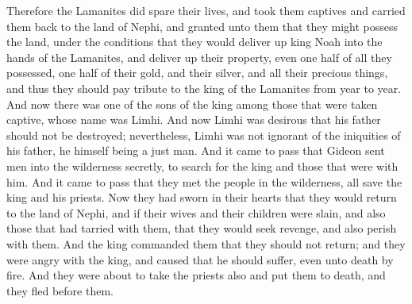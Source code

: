 Therefore the Lamanites did spare their lives, and took them captives and carried them back to the land of Nephi, and granted unto them that they might possess the land, under the conditions that they would deliver up king Noah into the hands of the Lamanites, and deliver up their property, even one half of all they possessed, one half of their gold, and their silver, and all their precious things, and thus they should pay tribute to the king of the Lamanites from year to year.
\bverse \iffalse And now there was one of the sons of the king among those that were taken captive, whose name was Limhi. \fi
And now there was one of the sons of the king among those that were taken captive, whose name was Limhi.
\bverse \iffalse And now Limhi was desirous that his father should not be destroyed; nevertheless, Limhi was not ignorant of the iniquities of his father, he himself being a just man. \fi
And now Limhi was desirous that his father should not be destroyed; nevertheless, Limhi was not ignorant of the iniquities of his father, he himself being a just man.
\bverse \iffalse And it came to pass that Gideon sent men into the wilderness secretly, to search for the king and those that were with him.  And it came to pass that they met the people in the wilderness, all save the king and his priests. \fi
And it came to pass that Gideon sent men into the wilderness secretly, to search for the king and those that were with him.  And it came to pass that they met the people in the wilderness, all save the king and his priests.
\bverse \iffalse Now they had sworn in their hearts that they would return to the land of Nephi, and if their wives and their children were slain, and also those that had tarried with them, that they would seek revenge, and also perish with them. \fi
Now they had sworn in their hearts that they would return to the land of Nephi, and if their wives and their children were slain, and also those that had tarried with them, that they would seek revenge, and also perish with them.
\bverse \iffalse And the king commanded them that they should not return; and they were angry with the king, and caused that he should suffer, even unto death by fire. \fi
And the king commanded them that they should not return; and they were angry with the king, and caused that he should suffer, even unto death by fire.
\bverse \iffalse And they were about to take the priests also and put them to death, and they fled before them. \fi
And they were about to take the priests also and put them to death, and they fled before them.
